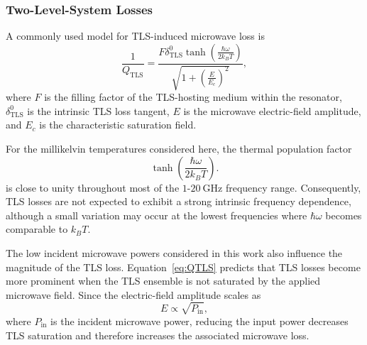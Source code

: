 \documentclass[
  aps,
  physrev,
  reprint,
  superscriptaddress,
  nofootinbib,
  amsmath,
  amssymb
]{revtex4-2}
\begin{document}
\subsubsection[\appendixname~\thesubsubsection]{Two-Level-System Losses}
\label{app:Rs_TLS}

A commonly used model for TLS-induced microwave loss is~\cite{Pappas2011}
\begin{equation}
    \frac{1}{Q_{\mathrm{TLS}}}=\frac{F \delta_{\mathrm{TLS}}^0\tanh\left(\frac{\hbar\omega}{2k_B T}\right)}{\sqrt{1+\left(\frac{E}{E_c}\right)^2}},
    \label{eq:QTLS}
\end{equation}
where $F$ is the filling factor of the TLS-hosting medium within the resonator, $\delta_{\mathrm{TLS}}^0$ is the intrinsic TLS loss tangent, $E$ is the microwave electric-field amplitude, and $E_c$ is the characteristic saturation field.

For the millikelvin temperatures considered here, the thermal population factor
\begin{equation}
    \tanh\left(\frac{\hbar\omega}{2k_B T}\right).
\end{equation}
is close to unity throughout most of the $1$-$20~\mathrm{GHz}$ frequency range. Consequently, TLS losses are not expected to exhibit a strong intrinsic frequency dependence, although a small variation may occur at the lowest frequencies where $\hbar\omega$ becomes comparable to $k_BT$.

The low incident microwave powers considered in this work also influence the magnitude of the TLS loss. Equation~\ref{eq:QTLS} predicts that TLS losses become more prominent when the TLS ensemble is not saturated by the applied microwave field. Since the electric-field amplitude scales as
\begin{equation}
        E \propto \sqrt{P_{\mathrm{in}}},
\end{equation}
where $P_{\mathrm{in}}$ is the incident microwave power, reducing the input power decreases TLS saturation and therefore increases the associated microwave loss.
 
\end{document}

